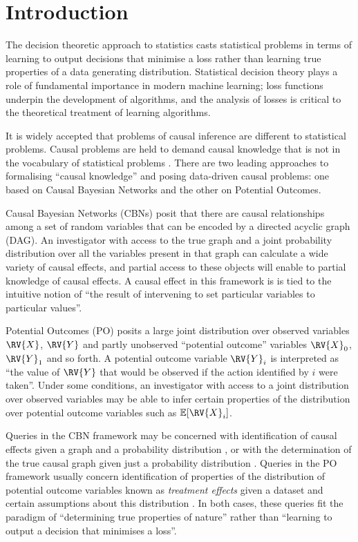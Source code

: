\section{Introduction}

\vspace{-3mm}

The decision theoretic approach to statistics casts statistical problems in terms of learning to output decisions that minimise a loss rather than learning true properties of a data generating distribution. Statistical decision theory plays a role of fundamental importance in modern machine learning; loss functions underpin the development of algorithms, and the analysis of losses is critical to the theoretical treatment of learning algorithms.

It is widely accepted that problems of causal inference are different to statistical problems. Causal problems are held to demand causal knowledge that is not in the vocabulary of statistical problems \citep{pearl_causality:_2009,cartwright_no_1994}. There are two leading approaches to formalising ``causal knowledge'' and posing data-driven causal problems: one based on Causal Bayesian Networks and the other on Potential Outcomes.

Causal Bayesian Networks (CBNs) posit that there are causal relationships among a set of random variables that can be encoded by a directed acyclic graph (DAG). An investigator with access to the true graph and a joint probability distribution over all the variables present in that graph can calculate a wide variety of causal effects, and partial access to these objects will enable to partial knowledge of causal effects. A causal effect in this framework is is tied to the intuitive notion of ``the result of intervening to set particular variables to particular values''.

Potential Outcomes (PO) posits a large joint distribution over observed variables $\RV{X}$, $\RV{Y}$ and partly unobserved ``potential outcome'' variables $\RV{X}_0$, $\RV{Y}_1$ and so forth. A potential outcome variable $\RV{Y}_i$ is interpreted as ``the value of $\RV{Y}$ that would be observed if the action identified by $i$ were taken''. Under some conditions, an investigator with access to a joint distribution over observed variables may be able to infer certain properties of the distribution over potential outcome variables such as $\mathbb{E}[\RV{X}_i]$.

Queries in the CBN framework may be concerned with identification of causal effects given a graph and a probability distribution \citep{tian2002general}, or with the determination of the true causal graph given just a probability distribution \citep{spirtes_causation_1993}. Queries in the PO framework usually concern identification of properties of the distribution of potential outcome variables known as \emph{treatment effects} given a dataset and certain assumptions about this distribution \citep{rubin_causal_2005,robins2010alternative}. In both cases, these queries fit the paradigm of ``determining true properties of nature'' rather than ``learning to output a decision that minimises a loss''.


